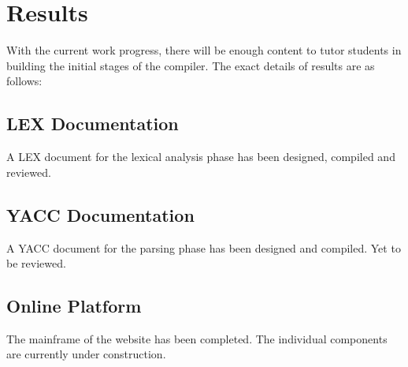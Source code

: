 \chapter{Results}
With the current work progress, there will be enough content to tutor students in building the initial stages of the compiler. The exact details of results are as follows: 
\section{LEX Documentation}
A LEX document for the lexical analysis phase has been designed, compiled and reviewed. 
\section{YACC Documentation}
A YACC document for the parsing phase has been designed and compiled. Yet to be reviewed. 
\section{Online Platform}
The mainframe of the website has been completed. The individual components are currently under construction. 


